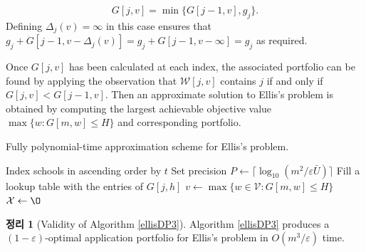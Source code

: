 \documentclass[12pt]{article} %
\newtheorem{theorem}{Theorem}
\theoremstyle{definition}
\newtheorem{theorem}{정리}
\theoremstyle{definition}
\begin{document}
\begin{equation}G[j, v] = \min\bigl\{G[j-1, v], g_j \bigr\}.\end{equation}
Defining $\Delta_j(v) = \infty$ in this case ensures that $g_j + G[j-1, v-\Delta_j(v)] = g_j+ G[j-1, v-\infty] = g_j $ as required.
%

Once $G[j, v]$ has been calculated at each index, the associated portfolio can be found by applying the observation that $\mathcal{W}[j, v]$ contains $j$ if and only if $G[j, v] < G[j-1, v]$. Then an approximate solution to Ellis's problem is obtained by computing the largest achievable objective value $\max\{ w: G[m, w] \leq H\}$ and corresponding portfolio.

\begin{algorithm}[H] 
\caption{Fully polynomial-time approximation scheme for Ellis's problem.} \label{ellisDP3}
\KwData{Utility values $t \in \mathbb{N}^m$, admissions probabilities $f \in (0, 1]^m$, application costs $g \in (0, \infty)^m$, budget $H \in (0, \infty)^m$, tolerance $\varepsilon \in (0, 1)$.}
Index schools in ascending order by $t$\;
Set precision $P \gets \bigl\lceil\log_{10}\left(m^2 / \varepsilon \bar U\right)\bigr\rceil$\;
Fill a lookup table with the entries of $G[j, h]$\; \label{createdlookuptable}
$v\gets  \max\{ w \in \mathcal{V} : G[m, w] \leq H\}$\; \label{vrecordedhere}
$\mathcal{X} \gets \O$\;
\end{algorithm}

\begin{theorem}[Validity of Algorithm \ref{ellisDP3}]
Algorithm \ref{ellisDP3} produces a $(1 - \varepsilon)$-optimal application portfolio for Ellis's problem in $O(m^3 /\varepsilon)$ time. %
\end{theorem}
\end{document}
